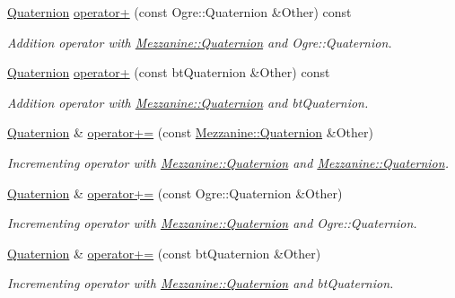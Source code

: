 \begin{DoxyCompactItemize}
\hyperlink{classMezzanine_1_1Quaternion}{Quaternion} \hyperlink{classMezzanine_1_1Quaternion_a45d20e0911c4358d39d8366fdfa2cf07}{operator+} (const Ogre::Quaternion \&Other) const 
\begin{DoxyCompactList}\small\item\em Addition operator with \hyperlink{classMezzanine_1_1Quaternion}{Mezzanine::Quaternion} and Ogre::Quaternion. \item\end{DoxyCompactList}\item 
\hyperlink{classMezzanine_1_1Quaternion}{Quaternion} \hyperlink{classMezzanine_1_1Quaternion_afc830546de620e7dc45339fc403962ec}{operator+} (const btQuaternion \&Other) const 
\begin{DoxyCompactList}\small\item\em Addition operator with \hyperlink{classMezzanine_1_1Quaternion}{Mezzanine::Quaternion} and btQuaternion. \item\end{DoxyCompactList}\item 
\hyperlink{classMezzanine_1_1Quaternion}{Quaternion} \& \hyperlink{classMezzanine_1_1Quaternion_ae1a1849a067502e9a5dcc2082c593f24}{operator+=} (const \hyperlink{classMezzanine_1_1Quaternion}{Mezzanine::Quaternion} \&Other)
\begin{DoxyCompactList}\small\item\em Incrementing operator with \hyperlink{classMezzanine_1_1Quaternion}{Mezzanine::Quaternion} and \hyperlink{classMezzanine_1_1Quaternion}{Mezzanine::Quaternion}. \item\end{DoxyCompactList}\item 
\hyperlink{classMezzanine_1_1Quaternion}{Quaternion} \& \hyperlink{classMezzanine_1_1Quaternion_a670eff2eac4268818738e2d10e81bc11}{operator+=} (const Ogre::Quaternion \&Other)
\begin{DoxyCompactList}\small\item\em Incrementing operator with \hyperlink{classMezzanine_1_1Quaternion}{Mezzanine::Quaternion} and Ogre::Quaternion. \item\end{DoxyCompactList}\item 
\hyperlink{classMezzanine_1_1Quaternion}{Quaternion} \& \hyperlink{classMezzanine_1_1Quaternion_ad1e665374b5754c349db390b8e30e67b}{operator+=} (const btQuaternion \&Other)
\begin{DoxyCompactList}\small\item\em Incrementing operator with \hyperlink{classMezzanine_1_1Quaternion}{Mezzanine::Quaternion} and btQuaternion. \item\end{DoxyCompactList}\item 

\end{DoxyCompactItemize}

